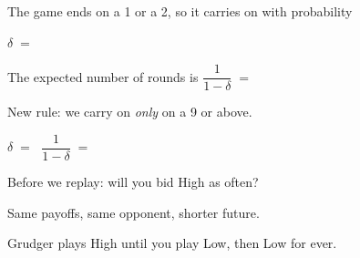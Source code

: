{\Large The game ends on a 1 or a 2, so it carries on with probability}

\vspace{1.0cm}

\begin{center}
{\Large \(\delta \;=\;\) }
\end{center}

\vspace{1.8cm}

\begin{center}
{\Large The expected number of rounds is \(\dfrac{1}{1 - \delta} \;=\;\)
}
\end{center}

\newpage
{}

\vspace{1.4cm}

{\Large New rule: we carry on \emph{only} on a 9 or above.}

\vspace{1.4cm}

\begin{center}
{\Large \(\delta \;=\;\) 
 \hspace{3cm}
 \(\dfrac{1}{1 - \delta} \;=\;\) }
\end{center}

\vspace{1.6cm}

{\Large Before we replay: will you bid High as often?
 }

\vspace{1.2cm}

{\large\color{inkgrey} Same payoffs, same opponent, shorter future.}

\newpage
{}

\vspace{0.5cm}

{\large Grudger plays High until you play Low, then Low for ever.}

\vspace{0.9cm}

